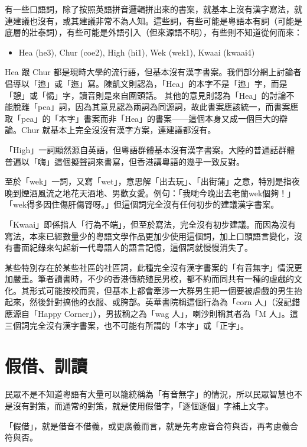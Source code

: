 \documentclass[a5paper, 10pt, openany]{book} %
\begin{document}
有一些口語詞，除了按照英語拼音邏輯拼出來的書案，就基本上沒有漢字寫法，就連建議也沒有，或其建議非常不為人知。這些詞，有些可能是粵語本有詞（可能是底層的壯泰詞），有些可能是外語引入（但來源語不明），有些則不知道從何而來：

\begin{itemize}
  \item Hea  (he3), Chur (coe2), High (hi1), Wek (wek1), Kwaai (kwaai4)
\end{itemize}

Hea 跟 Chur 都是現時大學的流行語，但基本沒有漢字書案。我們部分網上討論者倡導以「迆」或「迤」寫。陳凱文則認為，「Hea」的本字不是「迆」字，而是「憩」或「愒」字，讀音則是來自圍頭話。  其他的意見則認為「Hea」的討論不能脫離「pea」詞，因為其意見認為兩詞為同源詞，故此書案應該統一，而書案應取「pea」的「本字」書案而非「Hea」的書案——這個本身又成一個巨大的辯論。Chur 就基本上完全沒沒有漢字方案，連建議都沒有。

「High」一詞顯然源自英語，但粵語群體基本沒有漢字書案。大陸的普通話群體普遍以「嗨」這個擬聲詞來書寫，但香港講粵語的幾乎一致反對。

至於「wek」一詞，又寫「wet」，意思解「出去玩」、「出街蒲」之意，特別是指夜晚到煙酒風流之地花天酒地、男歡女愛。例句：「我哋今晚出去老蘭wek個夠！」「wek得多因住傷肝傷腎呀。」但這個詞完全沒有任何初步的建議漢字書案。

「Kwaai」即係指人「行為不端」，但至於寫法，完全沒有初步建議。而因為沒有寫法，本來已經數量少的粵語文學作品更加少使用這個詞，加上口頭語言變化，沒有書面紀錄來勾起新一代粵語人的語言記憶，這個詞就慢慢消失了。

某些特別存在於某些社區的社區詞，此種完全沒有漢字書案的「有音無字」情況更加嚴重。筆者讀書時，不少的香港傳統殖民男校，都不約而同共有一種的虐戲的文化。其形式可能按校而異，但基本上都會牽涉一大群男生把一個要被虐戲的男生抬起來，然後針對搞他的衣服、或胯部。英華書院稱這個行為為「corn 人」（沒記錯應源自「Happy Corner」），男拔稱之為「wag 人」，喇沙則稱其者為「M 人」。這三個詞完全沒有漢字書案，也不可能有所謂的「本字」或「正字」。

\section{假借、訓讀}

民眾不是不知道粵語有大量可以籠統稱為「有音無字」的情況，所以民眾智慧也不是沒有對策，而通常的對策，就是使用假借字，「逐個逐個」字補上文字。

「假借」，就是借音不借義，或更廣義而言，就是先考慮音合符與否，再考慮義合符與否。
\end{document}
